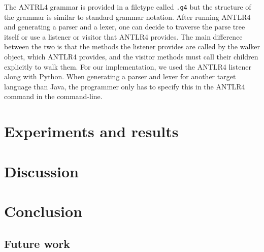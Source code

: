 \documentclass[a4paper]{report}
\begin{document}
The ANTRL4 grammar is provided in a filetype called \texttt{.g4} but the structure of the grammar is similar to standard grammar notation.
After running ANTLR4 and generating a parser and a lexer, one can decide to traverse the parse tree itself or use a listener or visitor that ANTLR4 provides. The main difference between the two is that the methods the listener provides are called by the walker object, which ANTLR4 provides, and the visitor methods must call their children explicitly to walk them.
For our implementation, we used the ANTLR4 listener along with Python. When generating a parser and lexer for another target language than Java, the programmer only has to specify this in the ANTLR4 command in the command-line.


\chapter{Experiments and results}
\chapter{Discussion}

\chapter{Conclusion}

\section{Future work}

\newpage


\end{document}
